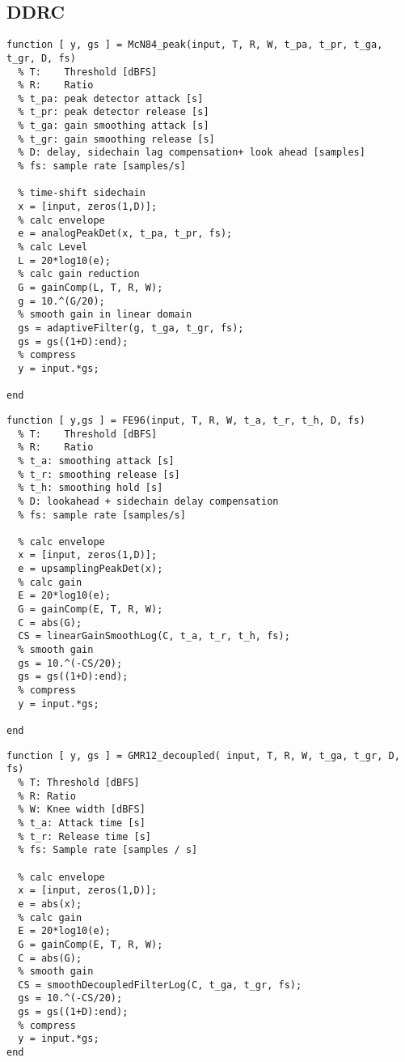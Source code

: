 \documentclass[../main2.tex]{subfiles}
\begin{document}

\subsection{DDRC}
\begin{lstlisting}[style=customc]
function [ y, gs ] = McN84_peak(input, T, R, W, t_pa, t_pr, t_ga, t_gr, D, fs)
  % T:    Threshold [dBFS]
  % R:    Ratio
  % t_pa: peak detector attack [s]
  % t_pr: peak detector release [s]
  % t_ga: gain smoothing attack [s]
  % t_gr: gain smoothing release [s]
  % D: delay, sidechain lag compensation+ look ahead [samples]
  % fs: sample rate [samples/s]

  % time-shift sidechain
  x = [input, zeros(1,D)];
  % calc envelope
  e = analogPeakDet(x, t_pa, t_pr, fs);
  % calc Level
  L = 20*log10(e);
  % calc gain reduction
  G = gainComp(L, T, R, W);
  g = 10.^(G/20);
  % smooth gain in linear domain
  gs = adaptiveFilter(g, t_ga, t_gr, fs);
  gs = gs((1+D):end);
  % compress
  y = input.*gs;
    
end
\end{lstlisting}


\begin{lstlisting}[style=customc]
function [ y,gs ] = FE96(input, T, R, W, t_a, t_r, t_h, D, fs)
  % T:    Threshold [dBFS]
  % R:    Ratio
  % t_a: smoothing attack [s]
  % t_r: smoothing release [s]
  % t_h: smoothing hold [s]
  % D: lookahead + sidechain delay compensation
  % fs: sample rate [samples/s]
  
  % calc envelope
  x = [input, zeros(1,D)];
  e = upsamplingPeakDet(x);
  % calc gain
  E = 20*log10(e);
  G = gainComp(E, T, R, W);
  C = abs(G);
  CS = linearGainSmoothLog(C, t_a, t_r, t_h, fs);
  % smooth gain
  gs = 10.^(-CS/20);
  gs = gs((1+D):end);
  % compress
  y = input.*gs;

end
\end{lstlisting}


\begin{lstlisting}[style=customc]
function [ y, gs ] = GMR12_decoupled( input, T, R, W, t_ga, t_gr, D, fs)
  % T: Threshold [dBFS]
  % R: Ratio
  % W: Knee width [dBFS]
  % t_a: Attack time [s]
  % t_r: Release time [s]
  % fs: Sample rate [samples / s]
  
  % calc envelope
  x = [input, zeros(1,D)];
  e = abs(x);
  % calc gain
  E = 20*log10(e);
  G = gainComp(E, T, R, W);
  C = abs(G);
  % smooth gain
  CS = smoothDecoupledFilterLog(C, t_ga, t_gr, fs);
  gs = 10.^(-CS/20);
  gs = gs((1+D):end);
  % compress
  y = input.*gs;
end
\end{lstlisting}
\end{document}
